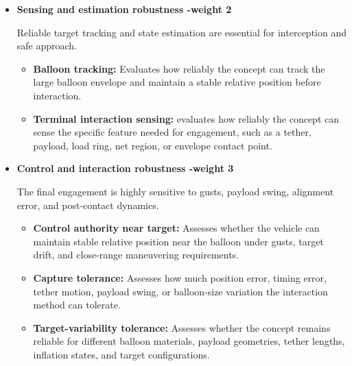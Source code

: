 \begin{itemize}
\begin{itemize}
        \item \textbf{Mission-stage complexity:} Assesses how many sequential mission-critical events must occur correctly, such as deployment, alignment, capture, release, deflation, or descent-system activation.
    \end{itemize}

    \item \textbf{Sensing and estimation robustness -weight 2}
    
    Reliable target tracking and state estimation are essential for interception and safe approach.
    
    \begin{itemize}
        \item \textbf{Balloon tracking:} Evaluates how reliably the concept can track the large balloon envelope and maintain a stable relative position before interaction.

        \item \textbf{Terminal interaction sensing:} evaluates how reliably the concept can sense the specific feature needed for engagement, such as a tether, payload, load ring, net region, or envelope contact point.
        
    \end{itemize}

    \item \textbf{Control and interaction robustness -weight 3}

    The final engagement is highly sensitive to gusts, payload swing, alignment error, and post-contact dynamics.
    
    \begin{itemize}
        \item \textbf{Control authority near target:} Assesses whether the vehicle can maintain stable relative position near the balloon under gusts, target drift, and close-range maneuvering requirements.
        
        \item \textbf{Capture tolerance:} Assesses how much position error, timing error, tether motion, payload swing, or balloon-size variation the interaction method can tolerate.
        
        \item \textbf{Target-variability tolerance:} Assesses whether the concept remains reliable for different balloon materials, payload geometries, tether lengths, inflation states, and target configurations.
        

\end{itemize}
\end{itemize}
